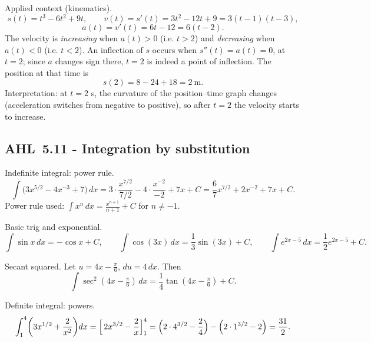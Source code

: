 \documentclass[11pt]{article}
\def\textbf#1{#1}%
\newcommand{\tocsubsection}[1]{\subsection{#1}}
\begin{document}
\begin{solution}
\textbf{Applied context (kinematics).}
\[
s(t)=t^{3}-6t^{2}+9t,\qquad v(t)=s'(t)=3t^{2}-12t+9=3(t-1)(t-3),
\]
\[
a(t)=v'(t)=6t-12=6(t-2).
\]
The velocity is \emph{increasing} when $a(t)>0$ (i.e. $t>2$) and \emph{decreasing} when $a(t)<0$ (i.e. $t<2$).
An inflection of $s$ occurs when $s''(t)=a(t)=0$, at $t=2$; since $a$ changes sign there, $t=2$ is indeed a point of inflection.
The position at that time is
\[
s(2)=8-24+18=2\ \text{m}.
\]
Interpretation: at $t=2$ s, the curvature of the position–time graph changes (acceleration switches from negative to positive), so after $t=2$ the velocity starts to increase.
\end{solution}

\tocsubsection{AHL 5.11 - Integration by substitution}


\begin{solution}
\textbf{Indefinite integral: power rule.}
\[
\int \!\bigl(3x^{5/2}-4x^{-3}+7\bigr)\,dx
=3\cdot\frac{x^{7/2}}{7/2}-4\cdot\frac{x^{-2}}{-2}+7x+C
=\frac{6}{7}x^{7/2}+2x^{-2}+7x+C .
\]
Power rule used: $\displaystyle \int x^{n}\,dx=\frac{x^{n+1}}{n+1}+C$ for $n\ne -1$.
\end{solution}

\begin{solution}
\textbf{Basic trig and exponential.}
\[
\int \sin x\,dx=-\cos x+C,\qquad
\int \cos(3x)\,dx=\frac{1}{3}\sin(3x)+C,\qquad
\int e^{2x-5}\,dx=\frac{1}{2}e^{2x-5}+C .
\]
\end{solution}

\begin{solution}
\textbf{Secant squared.}
Let $u=4x-\tfrac{\pi}{6}$, $du=4\,dx$. Then
\[
\int \sec^{2}(4x-\tfrac{\pi}{6})\,dx
=\frac{1}{4}\tan(4x-\tfrac{\pi}{6})+C .
\]
\end{solution}

\begin{solution}
\textbf{Definite integral: powers.}
\[
\int_{1}^{4}\!\left(3x^{1/2}+\frac{2}{x^{2}}\right)\!dx
=\Bigl[\,2x^{3/2}-\frac{2}{x}\Bigr]_{1}^{4}
=\Bigl(2\cdot 4^{3/2}-\frac{2}{4}\Bigr)-\Bigl(2\cdot 1^{3/2}-2\Bigr)
=\frac{31}{2}.
\]
\end{solution}
\end{document}
